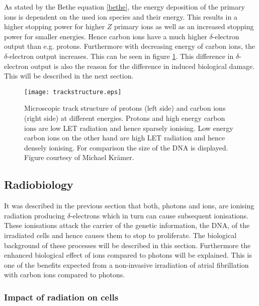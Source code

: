 \documentclass[type=dr, dr=rernat, accentcolor=tud7b,colorbacktitle, bigchapter, openright, twoside, 12pt ]{tudthesis}
\begin{document}
As stated by the Bethe equation \ref{bethe}, the energy deposition of the primary ions is dependent on the used ion species and their 
energy. This results in a higher stopping power for higher $Z$ primary ions as well as an increased stopping power for smaller energies. 
Hence carbon ions have a much higher $\delta$-electron output than e.g. protons. Furthermore with decreasing energy of 
carbon ions, the $\delta$-electron output increases. This can be seen in figure \ref{track}. This difference in $\delta$-electron output 
is also the reason for the difference in induced biological damage. This will be described in the next section.  

\newpage

\vspace*{1cm}

\begin{figure}[H]
\begin{center}
\texttt{[image: trackstructure.eps]}
\caption{Microscopic track structure of protons (left side) and carbon ions (right side) at different energies. Protons and high energy 
carbon ions are low LET radiation and hence sparsely ionising. Low energy carbon ions on the other hand are high LET radiation and hence 
densely ionising. For comparison the size of the DNA is displayed. Figure courtesy of Michael Kr\"amer.}
\label{track}
\end{center}
\end{figure}



\subsection{Radiobiology}

It was described in the previous section that both, photons and ions, are ionising radiation producing $\delta$-electrons which 
in turn can cause subsequent ionisations. These ionisations attack the carrier of the genetic information, the DNA, of the irradiated 
cells and hence causes them to stop to proliferate. The biological background of these processes will be described in this section. 
Furthermore the enhanced biological effect of ions compared to photons will be explained. This is one of the benefits expected from 
a non-invasive irradiation of atrial fibrillation with carbon ions compared to photons. 


\subsubsection{Impact of radiation on cells}
\end{document}
